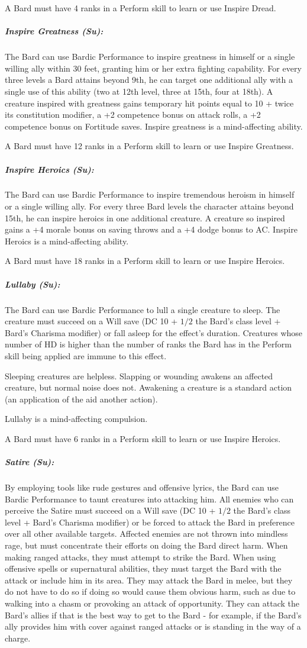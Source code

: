 A Bard must have 4 ranks in a Perform skill to learn or use Inspire Dread.
\subparagraph{Inspire Greatness (Su):}
The Bard can use Bardic Performance to inspire greatness in himself or a single willing ally within 30 feet, granting him or her extra fighting capability. 
For every three levels a Bard attains beyond 9th, he can target one additional ally with a single use of this ability (two at 12th level, three at 15th, four at 18th).
A creature inspired with greatness gains temporary hit points equal to 10 + twice its constitution modifier, a +2 competence bonus on attack rolls, a +2 competence bonus on Fortitude saves. Inspire greatness is a mind-affecting ability.

A Bard must have 12 ranks in a Perform skill to learn or use Inspire Greatness.
\subparagraph{Inspire Heroics (Su):}
The Bard can use Bardic Performance to inspire tremendous heroism in himself or a single willing ally.
For every three Bard levels the character attains beyond 15th, he can inspire heroics in one additional creature.
A creature so inspired gains a +4 morale bonus on saving throws and a +4 dodge bonus to AC. Inspire Heroics is a mind-affecting ability.

A Bard must have 18 ranks in a Perform skill to learn or use Inspire Heroics.
\subparagraph{Lullaby (Su):}
The Bard can use Bardic Performance to lull a single creature to sleep.
The creature must succeed on a Will save (DC 10 + $1/2$ the Bard's class level + Bard's Charisma modifier) or fall asleep for the effect's duration.
Creatures whose number of HD is higher than the number of ranks the Bard has in the Perform skill being applied are immune to this effect.

Sleeping creatures are helpless. Slapping or wounding awakens an affected creature, but normal noise does not. 
Awakening a creature is a standard action (an application of the aid another action).

Lullaby is a mind-affecting compulsion.

A Bard must have 6 ranks in a Perform skill to learn or use Inspire Heroics.
\subparagraph{Satire (Su):}
By employing tools like rude gestures and offensive lyrics, the Bard can use Bardic Performance to taunt creatures into attacking him.
All enemies who can perceive the Satire must succeed on a Will save (DC 10 + $1/2$ the Bard's class level + Bard's Charisma modifier) or be forced to attack the Bard in preference over all other available targets.
Affected enemies are not thrown into mindless rage, but must concentrate their efforts on doing the Bard direct harm. When making ranged attacks, they must attempt to strike the Bard. When using offensive spells or supernatural abilities, they must target the Bard with the attack or include him in its area. They may attack the Bard in melee, but they do not have to do so if doing so would cause them obvious harm, such as due to walking into a chasm or provoking an attack of opportunity. They can attack the Bard's allies if that is the best way to get to the Bard - for example, if the Bard's ally provides him with cover against ranged attacks or is standing in the way of a charge.

